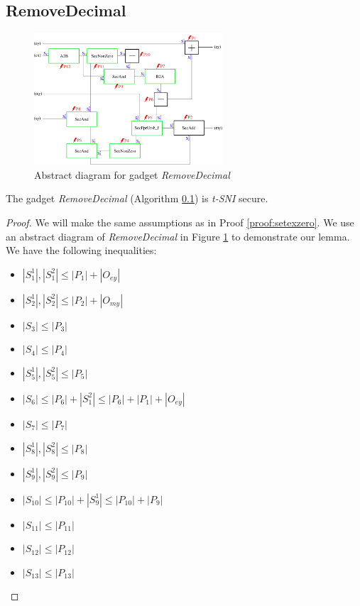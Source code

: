 \documentclass[runningheads]{llncs}
\begin{document}
\subsection{RemoveDecimal}
\label{alg:removedecimal}
\begin{figure}[!ht]
    \includegraphics[width=7cm]{figure/RemoveDec.pdf}
    \caption{Abstract diagram for gadget \emph{RemoveDecimal}}
    \label{fig:removedecimal}
\end{figure}
\begin{lemma}\label{lem:removedecimal}
    The gadget \emph{RemoveDecimal} (Algorithm \ref{alg:removedecimal}) is \emph{t-SNI} secure.    
\end{lemma}
\begin{proof}
    We will make the same assumptions as in Proof \ref{proof:setexzero}. We use an abstract diagram of \emph{RemoveDecimal} in Figure \ref{fig:removedecimal} to demonstrate our lemma. We have the following inequalities:
    \begin{multicols}{2}
        \begin{itemize}
            \item $|S_1^1|,|S_1^2|\leq|P_1| + |O_{ey}|$
            \item $|S_2^1|,|S_2^2|\leq|P_2| + |O_{my}|$
            \item $|S_3|\leq |P_3|$
            \item $|S_4|\leq|P_4|$
            \item $|S_5^1|,|S_5^2| \leq |P_5|$
            \item $|S_6| \leq |P_6| + |S_1^2| \leq |P_6| + |P_1| + |O_{ey}|$
            \item $|S_7|\leq|P_7|$
            \item $|S_8^1|,|S_8^2|\leq|P_8|$
            \item $|S_9^1|,|S_9^2| \leq|P_9|$
            \item $|S_10|\leq|P_10| + |S_9^1| \leq |P_10| + |P_9|$
            \item $|S_11| \leq |P_11|$
            \item $|S_12| \leq |P_12|$
            \item $|S_13| \leq |P_13|$
        \end{itemize}
    \end{multicols}

\end{proof}
\end{document}
